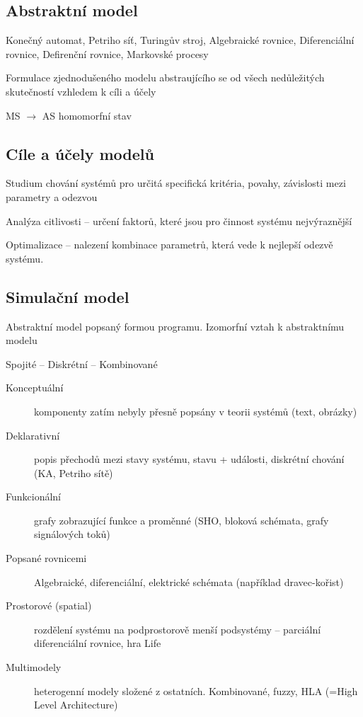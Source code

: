 \documentclass[a4wide]{report}
\begin{document}
\subsection{Abstraktní model}
Konečný automat, Petriho síť, Turingův stroj, Algebraické rovnice, Diferenciální rovnice, Defirenční rovnice, Markovské procesy

Formulace zjednodušeného modelu abstraujícího se od všech nedůležitých skutečností vzhledem k cíli a účely

MS $\to$ AS homomorfní stav

\subsection{Cíle a účely modelů}
Studium chování systémů pro určitá specifická kritéria, povahy, závislosti mezi parametry a odezvou

Analýza citlivosti -- určení faktorů, které jsou pro činnost systému nejvýraznější

Optimalizace -- nalezení kombinace parametrů, která vede k nejlepší odezvě systému.

\subsection{Simulační model}

Abstraktní model popsaný formou programu. Izomorfní vztah k abstraktnímu modelu

Spojité -- Diskrétní -- Kombinované
\begin{description}
	\item[Konceptuální] komponenty zatím nebyly přesně popsány v teorii systémů (text, obrázky)
	\item[Deklarativní] popis přechodů mezi stavy systému, stavu + události, diskrétní chování (KA, Petriho sítě)
	\item[Funkcionální] grafy zobrazující funkce a proměnné (SHO, bloková schémata, grafy signálových toků)
	\item[Popsané rovnicemi] Algebraické, diferenciální, elektrické schémata (například dravec-kořist)
	\item[Prostorové (spatial)] rozdělení systému na podprostorově menší podsystémy -- parciální diferenciální rovnice, hra Life
	\item[Multimodely] heterogenní modely složené z ostatních. Kombinované, fuzzy, HLA (=High Level Architecture)
\end{description}
\end{document}
